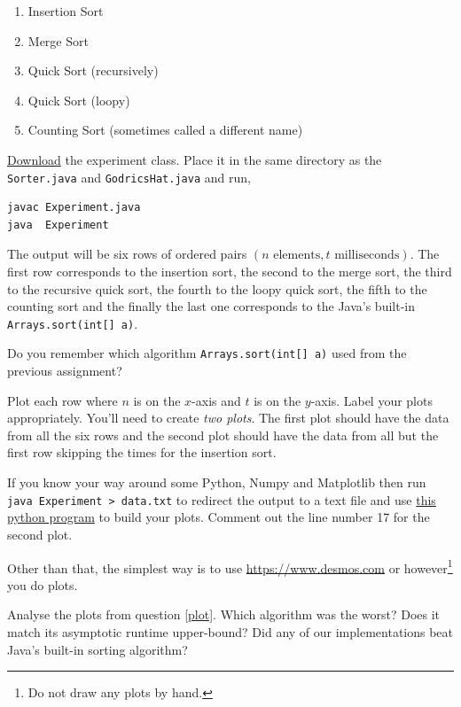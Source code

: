 \documentclass{homework}
\begin{document}
\begin{enumerate}
    \item Insertion Sort
    \item Merge Sort
    \item Quick Sort (recursively)
    \item Quick Sort (loopy)
    \item Counting Sort (sometimes called a different name)
\end{enumerate}

\question\label{plot} \href{https://tashfeen.org/raw/share/ds/Experiment.java}{Download} the experiment class. Place it in the same directory as the \texttt{Sorter.java} and \texttt{GodricsHat.java} and run,
\begin{verbatim}
javac Experiment.java
java  Experiment
\end{verbatim}

The output will be six rows of ordered pairs $(n \text{ elements}, t \text{ milliseconds})$. The first row corresponds to the insertion sort, the second to the merge sort, the third to the recursive quick sort, the fourth to the loopy quick sort, the fifth to the counting sort and the finally the last one corresponds to the Java's built-in \texttt{Arrays.sort(int[] a)}.

Do you remember which algorithm \texttt{Arrays.sort(int[] a)} used from the previous assignment?

Plot each row where $n$ is on the $x$-axis and $t$ is on the $y$-axis. Label your plots appropriately. You'll need to create \textit{two plots}. The first plot should have the data from all the six rows and the second plot should have the data from all but the first row \ie skipping the times for the insertion sort.

If you know your way around some Python, Numpy and Matplotlib then run \texttt{java  Experiment > data.txt} to redirect the output to a text file and use \href{https://tashfeen.org/raw/share/ds/plot.py}{this python program} to build your plots. Comment out the line number 17 for the second plot.

Other than that, the simplest way is to use \url{https://www.desmos.com} or however\footnote{Do not draw any plots by hand.} you do plots. 

\question Analyse the plots from question \ref{plot}. Which algorithm was the worst? Does it match its asymptotic runtime upper-bound? Did any of our implementations beat Java's built-in sorting algorithm?
\end{document}
